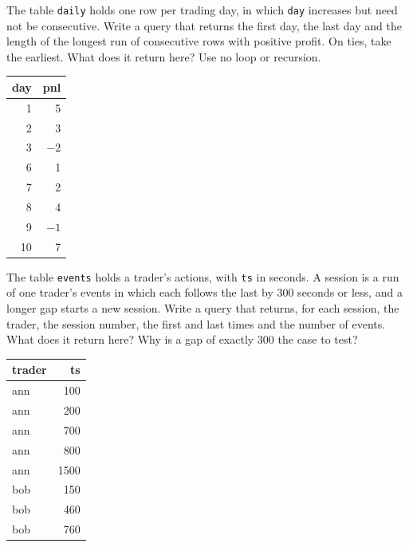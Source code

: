 \begin{question}\label{iq:iv3:sql-and-data:18}
The table \texttt{daily} holds one row per trading day, in which \texttt{day} increases but need not be consecutive. Write a query that returns the first day, the last day and the length of the longest run of consecutive rows with positive profit. On ties, take the earliest. What does it return here? Use no loop or recursion.
\begin{center}\small
\begin{tabular}{rr}
day & pnl\\\hline
1 & 5\\
2 & 3\\
3 & $-2$\\
6 & 1\\
7 & 2\\
8 & 4\\
9 & $-1$\\
10 & 7
\end{tabular}
\end{center}
\end{question}

\begin{question}\label{iq:iv3:sql-and-data:19}
The table \texttt{events} holds a trader's actions, with \texttt{ts} in seconds. A session is a run of one trader's events in which each follows the last by 300 seconds or less, and a longer gap starts a new session. Write a query that returns, for each session, the trader, the session number, the first and last times and the number of events. What does it return here? Why is a gap of exactly 300 the case to test?
\begin{center}\small
\begin{tabular}{lr}
trader & ts\\\hline
ann & 100\\
ann & 200\\
ann & 700\\
ann & 800\\
ann & 1500\\
bob & 150\\
bob & 460\\
bob & 760
\end{tabular}
\end{center}
\end{question}

